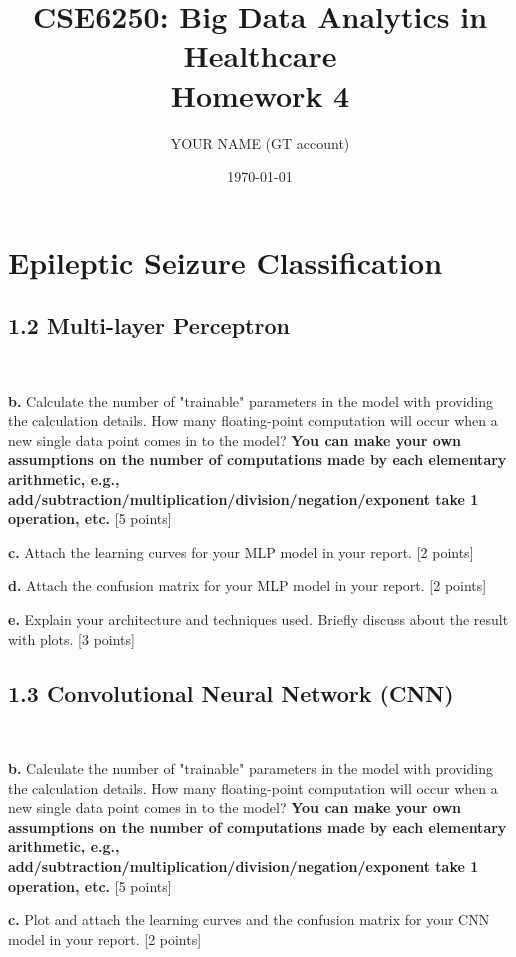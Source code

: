 \documentclass[12pt]{article}
\title{CSE6250: Big Data Analytics in Healthcare \\ Homework 4}
\author{YOUR NAME (GT account)}
\date{\today}
\begin{document}
\maketitle

\section{Epileptic Seizure Classification}

\subsection*{1.2 Multi-layer Perceptron}
~

\textbf{b.} Calculate the number of "trainable" parameters in the model with providing the calculation details. How many floating-point computation will occur when a new single data point comes in to the model?  \textbf{You can make your own assumptions on the number of computations made by each elementary arithmetic, e.g., add/subtraction/multiplication/division/negation/exponent take 1 operation, etc.} [5 points]

\bigskip

\textbf{c.} Attach the learning curves for your MLP model in your report. [2 points]

\bigskip

\textbf{d.} Attach the confusion matrix for your MLP model in your report. [2 points]

\bigskip
\textbf{e.} Explain your architecture and techniques used. Briefly discuss about the result with plots. [3 points]

\subsection*{1.3 Convolutional Neural Network (CNN)}
~

\textbf{b.} Calculate the number of "trainable" parameters in the model with providing the calculation details. How many floating-point computation will occur when a new single data point comes in to the model?  \textbf{You can make your own assumptions on the number of computations made by each elementary arithmetic, e.g., add/subtraction/multiplication/division/negation/exponent take 1 operation, etc.} [5 points]

\bigskip

\textbf{c.} Plot and attach the learning curves and the confusion matrix for your CNN model in your report. [2 points]
\end{document}
